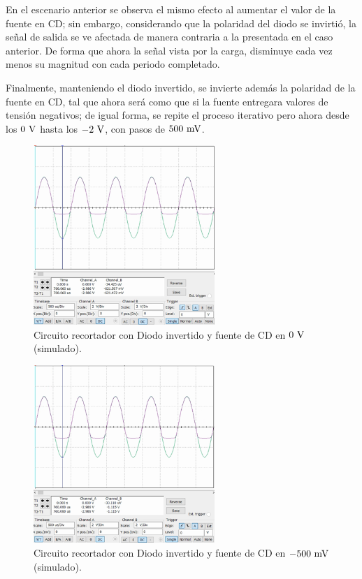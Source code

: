 \documentclass[journal]{IEEEtran}
\begin{document}
En el escenario anterior se observa el mismo efecto al aumentar el valor de la fuente en CD; sin embargo, considerando
que la polaridad del diodo se invirtió, la señal de salida se ve afectada de manera contraria a la presentada en el caso anterior.
De forma que ahora la señal vista por la carga, disminuye cada vez menos su magnitud con cada periodo completado.

Finalmente, manteniendo el diodo invertido, se invierte además la polaridad de la fuente en CD, tal que ahora será como que si la fuente
entregara valores de tensión negativos; de igual forma, se repite el proceso iterativo pero ahora desde los $0~\textnormal{V}$ hasta los $-2~\textnormal{V}$, con pasos de $500~\textnormal{mV}$.
\begin{figure}[H]
        \centering
        \includegraphics[width=2.7in]{SignalSimulated_15.png}
        \caption{Circuito recortador con Diodo invertido y fuente de CD en $0~\textnormal{V}$ (simulado).}
        \label{fig:SignalSimulated_15}
\end{figure}
\vspace{-0.6cm}
\begin{figure}[H]
        \centering
        \includegraphics[width=2.7in]{SignalSimulated_16.png}
        \caption{Circuito recortador con Diodo invertido y fuente de CD en $-500~\textnormal{mV}$ (simulado).}
        \label{fig:SignalSimulated_16}
\end{figure}
\end{document}
